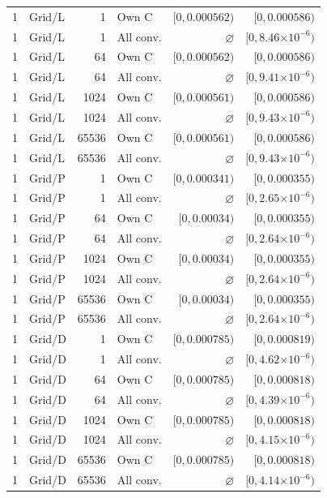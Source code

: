 \begin{longtable}{llrlrr}
1 & Grid/L & 1 & Own C & $[0, 0.000562)$ & $[0, 0.000586)$ \\
1 & Grid/L & 1 & All conv. & $\varnothing$ & $[0, 8.46\mathord{\times}10^{-6})$ \\
1 & Grid/L & 64 & Own C & $[0, 0.000562)$ & $[0, 0.000586)$ \\
1 & Grid/L & 64 & All conv. & $\varnothing$ & $[0, 9.41\mathord{\times}10^{-6})$ \\
1 & Grid/L & 1024 & Own C & $[0, 0.000561)$ & $[0, 0.000586)$ \\
1 & Grid/L & 1024 & All conv. & $\varnothing$ & $[0, 9.43\mathord{\times}10^{-6})$ \\
1 & Grid/L & 65536 & Own C & $[0, 0.000561)$ & $[0, 0.000586)$ \\
1 & Grid/L & 65536 & All conv. & $\varnothing$ & $[0, 9.43\mathord{\times}10^{-6})$ \\
1 & Grid/P & 1 & Own C & $[0, 0.000341)$ & $[0, 0.000355)$ \\
1 & Grid/P & 1 & All conv. & $\varnothing$ & $[0, 2.65\mathord{\times}10^{-6})$ \\
1 & Grid/P & 64 & Own C & $[0, 0.00034)$ & $[0, 0.000355)$ \\
1 & Grid/P & 64 & All conv. & $\varnothing$ & $[0, 2.64\mathord{\times}10^{-6})$ \\
1 & Grid/P & 1024 & Own C & $[0, 0.00034)$ & $[0, 0.000355)$ \\
1 & Grid/P & 1024 & All conv. & $\varnothing$ & $[0, 2.64\mathord{\times}10^{-6})$ \\
1 & Grid/P & 65536 & Own C & $[0, 0.00034)$ & $[0, 0.000355)$ \\
1 & Grid/P & 65536 & All conv. & $\varnothing$ & $[0, 2.64\mathord{\times}10^{-6})$ \\
1 & Grid/D & 1 & Own C & $[0, 0.000785)$ & $[0, 0.000819)$ \\
1 & Grid/D & 1 & All conv. & $\varnothing$ & $[0, 4.62\mathord{\times}10^{-6})$ \\
1 & Grid/D & 64 & Own C & $[0, 0.000785)$ & $[0, 0.000818)$ \\
1 & Grid/D & 64 & All conv. & $\varnothing$ & $[0, 4.39\mathord{\times}10^{-6})$ \\
1 & Grid/D & 1024 & Own C & $[0, 0.000785)$ & $[0, 0.000818)$ \\
1 & Grid/D & 1024 & All conv. & $\varnothing$ & $[0, 4.15\mathord{\times}10^{-6})$ \\
1 & Grid/D & 65536 & Own C & $[0, 0.000785)$ & $[0, 0.000818)$ \\
1 & Grid/D & 65536 & All conv. & $\varnothing$ & $[0, 4.14\mathord{\times}10^{-6})$ \\
\end{longtable}
\endgroup



